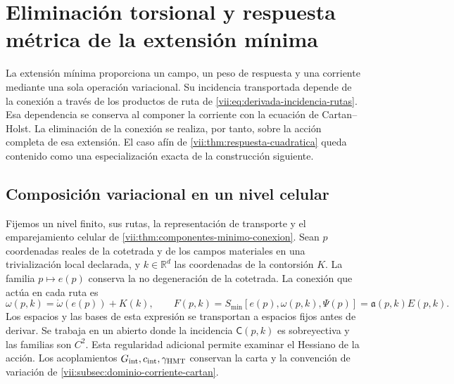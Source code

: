 
\section{Eliminación torsional y respuesta métrica de la extensión mínima}
\label{vii:sec:eliminacion-torsional-no-lineal}

La extensión mínima proporciona un campo, un peso de respuesta y una
corriente mediante una sola operación variacional. Su incidencia
transportada depende de la conexión a través de los productos de ruta de
\eqref{vii:eq:derivada-incidencia-rutas}. Esa dependencia se conserva al
componer la corriente con la ecuación de Cartan--Holst. La eliminación
de la conexión se realiza, por tanto, sobre la acción completa de esa
extensión. El caso afín de
\ref{vii:thm:respuesta-cuadratica} queda contenido como una
especialización exacta de la construcción siguiente.

\subsection{Composición variacional en un nivel celular}
\label{vii:subsec:composicion-torsional-celular}

Fijemos un nivel finito, sus rutas, la representación de transporte y
el emparejamiento celular de
\ref{vii:thm:componentes-minimo-conexion}. Sean \(p\) coordenadas
reales de la cotetrada y de los campos materiales en una trivialización
local declarada, y \(k\in\mathbb R^d\) las coordenadas de la
contorsión \(K\). La familia \(p\mapsto e(p)\) conserva la
no degeneración de la cotetrada. La conexión que actúa en cada ruta es
\begin{equation}
 \omega(p,k)=\mathring\omega(e(p))+K(k),\qquad
 F(p,k)=S_{\min}[e(p),\omega(p,k),\Psi(p)]
       =\mathfrak a(p,k)E(p,k).
 \label{vii:eq:accion-minima-en-contorsion}
\end{equation}
Los espacios y las bases de esta expresión se transportan a espacios
fijos antes de derivar. Se trabaja en un abierto donde la incidencia
\(\mathsf C(p,k)\) es sobreyectiva y las familias son \(C^2\).
Esta regularidad adicional permite examinar el Hessiano de la acción.
Los acoplamientos \(G_{\rm int},c_{\rm int},\gamma_{\rm HMT}\)
conservan la carta y la convención de variación de
\ref{vii:subsec:dominio-corriente-cartan}.

